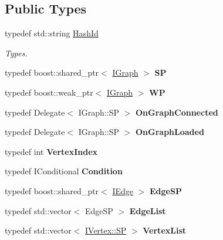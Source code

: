\subsection*{Public Types}
\begin{DoxyCompactItemize}
\item 
\mbox{\label{class_i_graph_a27d53eee7b0a7abc9fce6c28983d5446}} 
typedef std\+::string \hyperlink{class_i_graph_a27d53eee7b0a7abc9fce6c28983d5446}{Hash\+Id}
\begin{DoxyCompactList}\small\item\em Types. \end{DoxyCompactList}\item 
\mbox{\label{class_i_graph_a6a00cab0e8778831f5988ee0b678253e}} 
typedef boost\+::shared\+\_\+ptr$<$ \hyperlink{class_i_graph}{I\+Graph} $>$ {\bfseries SP}
\item 
\mbox{\label{class_i_graph_ae52fe400e2c4d8f8733e29fbe3bee6cb}} 
typedef boost\+::weak\+\_\+ptr$<$ \hyperlink{class_i_graph}{I\+Graph} $>$ {\bfseries WP}
\item 
\mbox{\label{class_i_graph_aa0a2944fd6779519d525b31be0fe14e4}} 
typedef Delegate$<$ I\+Graph\+::\+SP $>$ {\bfseries On\+Graph\+Connected}
\item 
\mbox{\label{class_i_graph_a37283b170085021f81b9391c85a16371}} 
typedef Delegate$<$ I\+Graph\+::\+SP $>$ {\bfseries On\+Graph\+Loaded}
\item 
\mbox{\label{class_i_graph_a0bc66accdc6a8a405627ecbd2ba18a2f}} 
typedef int {\bfseries Vertex\+Index}
\item 
\mbox{\label{class_i_graph_aa4a8ebca420160b744af3caa9c1d075e}} 
typedef I\+Conditional {\bfseries Condition}
\item 
\mbox{\label{class_i_graph_a0529033d1feceeb0299160d356dfac9d}} 
typedef boost\+::shared\+\_\+ptr$<$ \hyperlink{class_i_graph_1_1_i_edge}{I\+Edge} $>$ {\bfseries Edge\+SP}
\item 
\mbox{\label{class_i_graph_a170fc85a23f5a6e2d4c31a58aa95feaa}} 
typedef std\+::vector$<$ Edge\+SP $>$ {\bfseries Edge\+List}
\item 
\mbox{\label{class_i_graph_a3402e475513468eebc284b85af5c5a42}} 
typedef std\+::vector$<$ \hyperlink{class_i_graph_1_1_i_vertex_af72b9df91f110bc7824c608c10cc819c}{I\+Vertex\+::\+SP} $>$ {\bfseries Vertex\+List}
\end{DoxyCompactItemize}
